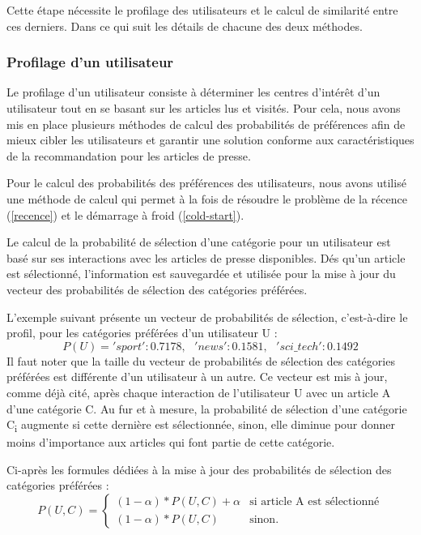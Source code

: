     Cette étape nécessite le profilage des utilisateurs et le calcul de similarité entre ces derniers. Dans ce qui suit les détails de chacune des deux méthodes.

        \subsubsection{Profilage d'un utilisateur}\label{proba-selct}
        Le profilage d'un utilisateur consiste à déterminer les centres d'intérêt d'un utilisateur tout en se basant sur les articles lus et visités. Pour cela, nous avons mis en place plusieurs méthodes de calcul des probabilités de préférences afin de mieux cibler les utilisateurs et garantir une solution conforme aux caractéristiques de la recommandation pour les articles de presse. 

        Pour le calcul des probabilités des préférences des utilisateurs, nous avons utilisé une méthode de calcul qui permet à la fois de résoudre le problème de la récence (\autoref{recence}) et le démarrage à froid (\autoref{cold-start}).

        Le calcul de la probabilité de sélection d'une catégorie pour un utilisateur est basé sur ses interactions avec les articles de presse disponibles. Dés qu'un article est sélectionné, l'information est sauvegardée et utilisée pour la mise à jour du vecteur des probabilités de sélection des catégories préférées.

        L'exemple suivant présente un vecteur de probabilités de sélection, c'est-à-dire le profil, pour les catégories préférées d'un utilisateur U :
            \[P(U) = {'sport': 0.7178,\text{ }'news': 0.1581,\text{ }'sci\_tech': 0.1492}\]            
        Il faut noter que la taille du vecteur de probabilités de sélection des catégories préférées est différente d'un utilisateur à un autre. Ce vecteur est mis à jour, comme déjà cité, après chaque interaction de l'utilisateur U avec un article A d'une catégorie C. Au fur et à mesure, la probabilité de sélection d'une catégorie C\textsubscript{i} augmente si cette dernière est sélectionnée, sinon, elle diminue pour donner moins d'importance aux articles qui font partie de cette catégorie.

        Ci-après les formules dédiées à la mise à jour des probabilités de sélection des catégories préférées :\\
            \[
            P(U, C) =
            \begin{cases}
                (1-{\alpha}) * {P(U, C)} + {\alpha} & \text{si } \text{article A est sélectionné} \\
                (1-{\alpha}) * {P(U, C)} & \text{sinon.}
            \end{cases}
            \]

